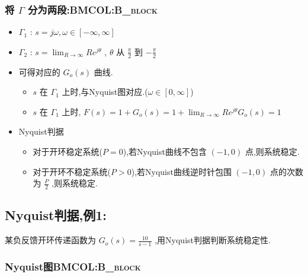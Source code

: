 \documentclass[table]{beamer}
\begin{document}
\subsubsection[将 \(\Gamma\) 分为两段:]{将 \(\Gamma\) 分为两段:\hfill{}\textsc{BMCOL:B\_block}}
\label{sec:org3060a3d}
\begin{itemize}
\item \(\Gamma_1\) : \(s=j\omega,\omega\in[-\infty,\infty]\)
\item \(\Gamma_2\) : \(s=\lim_{R\rightarrow\infty}Re^{j\theta}\) , \(\theta\) 从 \(\frac{\pi}{2}\) 到 \(-\frac{\pi}{2}\)
\item 可得对应的 \(G_o(s)\) 曲线.
\begin{itemize}
\item \(s\) 在 \(\Gamma_1\) 上时,与Nyquist图对应.(\(\omega\in[0,\infty]\))
\item \(s\) 在 \(\Gamma_1\) 上时, \(F(s)=1+G_o(s)=1+\lim_{R\rightarrow\infty}Re^{j\theta}G_o(s)=1\)
\end{itemize}
\item <3-> Nyquist判据
\begin{itemize}
\item 对于开环稳定系统(\(P=0\)),若Nyquist曲线不包含 \((-1,0)\) 点,则系统稳定.
\item 对于开环不稳定系统(\(P>0\)),若Nyquist曲线逆时针包围 \((-1,0)\) 点的次数为 \(\frac{P}{2}\) ,则系统稳定.
\end{itemize}
\end{itemize}

\subsection{Nyquist判据,例1:}
\label{sec:org083180e}
某负反馈开环传递函数为 \(G_o(s)=\frac{10}{s-1}\) ,用Nyquist判据判断系统稳定性.

\subsubsection[Nyquist图]{Nyquist图\hfill{}\textsc{BMCOL:B\_block}}
\label{sec:org25f467f}
\end{document}
